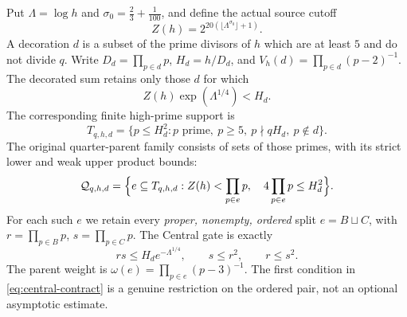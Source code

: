 \documentclass[11pt]{article}
\theoremstyle{definition}
\theoremstyle{remark}
\newcommand{\1}{\mathbf 1}
\begin{document}
Put $\Lambda=\log h$ and $\sigma_0=\frac23+\frac1{100}$, and define
the actual source cutoff
\begin{equation}\label{eq:source-Z}
 Z(h)=2^{20(\lfloor\Lambda^{\sigma_0}\rfloor+1)}.
\end{equation}
A decoration $d$ is a subset of the prime divisors of $h$ which
are at least $5$ and do not divide $q$. Write
$D_d=\prod_{p\in d}p$, $H_d=h/D_d$, and
$V_h(d)=\prod_{p\in d}(p-2)^{-1}$. The decorated sum retains only
those $d$ for which
\begin{equation}\label{eq:active-decoration}
  Z(h)\exp(\Lambda^{1/4})<H_d.
\end{equation}
The corresponding finite high-prime support is
\[
 T_{q,h,d}=\{p\le H_d^2:p\text{ prime},\ p\ge5,\ p\nmid qH_d,
                 \ p\notin d\}.
\]
The original quarter-parent family consists of sets of those primes,
with its strict lower and weak upper product bounds:
\begin{equation}\label{eq:quarter-parent-contract}
 \mathcal Q_{q,h,d}=
  \Bigl\{e\subseteq T_{q,h,d}:
   Z(h)<\prod_{p\in e}p,\quad
   4\prod_{p\in e}p\le H_d^2\Bigr\}.
\end{equation}
For each such $e$ we retain every \emph{proper, nonempty,
ordered} split $e=B\sqcup C$, with
$r=\prod_{p\in B}p$, $s=\prod_{p\in C}p$.
The Central gate is exactly
\begin{equation}\label{eq:central-contract}
 rs\le H_d e^{-\Lambda^{1/4}},\qquad
 s\le r^2,\qquad r\le s^2.
\end{equation}
The parent weight is $\omega(e)=\prod_{p\in e}(p-3)^{-1}$.
The first condition in \eqref{eq:central-contract} is a genuine
restriction on the ordered pair, not an optional asymptotic estimate.
\end{document}
